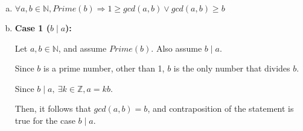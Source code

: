 \documentclass[12pt]{article}
\begin{document}
\begin{enumerate}[a.]
    \item

    $\forall a,b \in \mathbb{N}, Prime(b) \Rightarrow 1 \geq gcd(a,b) \lor gcd(a,b) \geq b$

    \item

    \textbf{Case 1 ($b \mid a$):}

    \bigskip

    Let $a,b \in \mathbb{N}$, and assume $Prime(b)$. Also assume $b \mid a$.

    \bigskip

    Since $b$ is a prime number, other than 1, $b$ is the only number that divides $b$.

    \bigskip

    Since $b \mid a,\:\exists k \in \mathbb{Z}, a = kb$.

    \bigskip

    Then, it follows that $gcd(a,b) = b$, and contraposition of the statement is true
    for the case $b \mid a$.

\end{enumerate}
\end{document}
